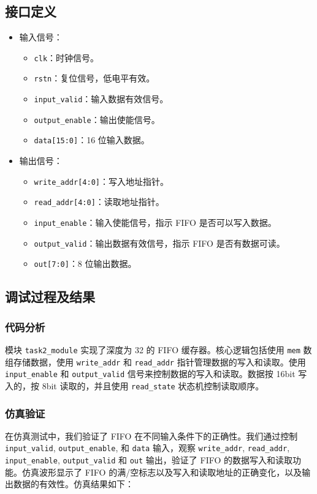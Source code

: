 \documentclass[zihao=5, UTF8]{article}
\theoremstyle{MyLineTheoremStyle} %
\theoremstyle{MyBlockTheoremStyle} %
\theoremstyle{MySubsubsectionStyle} %
\begin{document}
\subsection{接口定义}
\begin{itemize}
    \item 输入信号：
    \begin{itemize}
        \item \texttt{clk}：时钟信号。
        \item \texttt{rstn}：复位信号，低电平有效。
        \item \texttt{input\_valid}：输入数据有效信号。
        \item \texttt{output\_enable}：输出使能信号。
        \item \texttt{data[15:0]}：16 位输入数据。
    \end{itemize}
    \item 输出信号：
    \begin{itemize}
        \item \texttt{write\_addr[4:0]}：写入地址指针。
        \item \texttt{read\_addr[4:0]}：读取地址指针。
        \item \texttt{input\_enable}：输入使能信号，指示 FIFO 是否可以写入数据。
        \item \texttt{output\_valid}：输出数据有效信号，指示 FIFO 是否有数据可读。
        \item \texttt{out[7:0]}：8 位输出数据。
    \end{itemize}
\end{itemize}

\subsection{调试过程及结果}
\subsubsection{代码分析}
模块 \texttt{task2\_module} 实现了深度为 32 的 FIFO 缓存器。核心逻辑包括使用 \texttt{mem} 数组存储数据，使用 \texttt{write\_addr} 和 \texttt{read\_addr} 指针管理数据的写入和读取。使用 \texttt{input\_enable} 和 \texttt{output\_valid} 信号来控制数据的写入和读取。数据按 16bit 写入的，按 8bit 读取的，并且使用 \texttt{read\_state} 状态机控制读取顺序。

\subsubsection{仿真验证}
在仿真测试中，我们验证了 FIFO 在不同输入条件下的正确性。我们通过控制 \texttt{input\_valid}, \texttt{output\_enable}, 和 \texttt{data} 输入，观察 \texttt{write\_addr}, \texttt{read\_addr}, \texttt{input\_enable}, \texttt{output\_valid} 和 \texttt{out} 输出，验证了 FIFO 的数据写入和读取功能。仿真波形显示了 FIFO 的满/空标志以及写入和读取地址的正确变化，以及输出数据的有效性。仿真结果如下：
\end{document}
